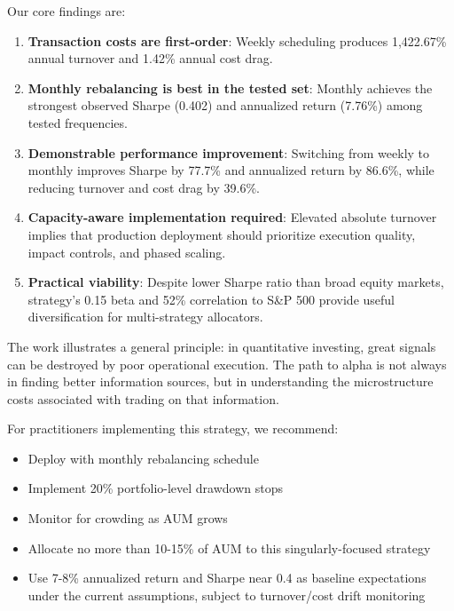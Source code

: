 \documentclass[twocolumn,ieee]{Base_Latex_Template/arithmaxresearch}
\begin{document}
Our core findings are:

\begin{enumerate}
\item \textbf{Transaction costs are first-order}: Weekly scheduling produces 1,422.67\% annual turnover and 1.42\% annual cost drag.

\item \textbf{Monthly rebalancing is best in the tested set}: Monthly achieves the strongest observed Sharpe (0.402) and annualized return (7.76\%) among tested frequencies.

\item \textbf{Demonstrable performance improvement}: Switching from weekly to monthly improves Sharpe by 77.7\% and annualized return by 86.6\%, while reducing turnover and cost drag by 39.6\%.

\item \textbf{Capacity-aware implementation required}: Elevated absolute turnover implies that production deployment should prioritize execution quality, impact controls, and phased scaling.

\item \textbf{Practical viability}: Despite lower Sharpe ratio than broad equity markets, strategy's 0.15 beta and 52\% correlation to S\&P 500 provide useful diversification for multi-strategy allocators.
\end{enumerate}

The work illustrates a general principle: in quantitative investing, great signals can be destroyed by poor operational execution. The path to alpha is not always in finding better information sources, but in understanding the microstructure costs associated with trading on that information.

For practitioners implementing this strategy, we recommend:
\begin{itemize}
\item Deploy with monthly rebalancing schedule
\item Implement 20\% portfolio-level drawdown stops
\item Monitor for crowding as AUM grows
\item Allocate no more than 10-15\% of AUM to this singularly-focused strategy
\item Use 7-8\% annualized return and Sharpe near 0.4 as baseline expectations under the current assumptions, subject to turnover/cost drift monitoring
\end{itemize}

\end{document}
